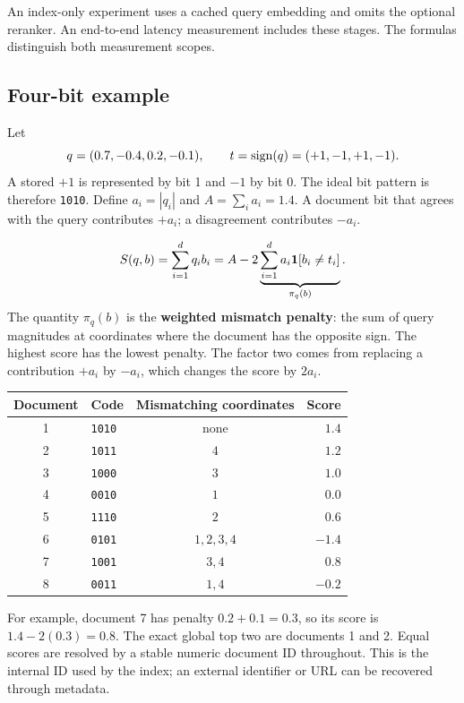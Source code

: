 An index-only experiment uses a cached query embedding and omits the optional
reranker. An end-to-end latency measurement includes these stages. The formulas distinguish
both measurement scopes.

\subsection{Four-bit example}
Let
\[
q=(0.7,-0.4,0.2,-0.1),\qquad t=\operatorname{sign}(q)=(+1,-1,+1,-1).
\]
A stored $+1$ is represented by bit 1 and $-1$ by bit 0. The ideal bit pattern is therefore
\texttt{1010}. Define $a_i=|q_i|$ and $A=\sum_i a_i=1.4$. A document bit that agrees with the
query contributes $+a_i$; a disagreement contributes $-a_i$.

\begin{equation}
S(q,b)=\sum_{i=1}^{d}q_i b_i
       =A-2\underbrace{\sum_{i=1}^{d}a_i\mathbf 1[b_i\ne t_i]}_{\pi_q(b)}.
\label{eq:score}
\end{equation}
The quantity $\pi_q(b)$ is the \textbf{weighted mismatch penalty}: the sum of query
magnitudes at coordinates where the document has the opposite sign. The highest score has the lowest penalty. The factor two comes from replacing a
contribution $+a_i$ by $-a_i$, which changes the score by $2a_i$.

\begin{center}
\begin{tabular}{@{}clcr@{}}\toprule
Document & Code & Mismatching coordinates & Score\\\midrule
1 & \texttt{1010} & none & $1.4$\\
2 & \texttt{1011} & $4$ & $1.2$\\
3 & \texttt{1000} & $3$ & $1.0$\\
4 & \texttt{0010} & $1$ & $0.0$\\
5 & \texttt{1110} & $2$ & $0.6$\\
6 & \texttt{0101} & $1,2,3,4$ & $-1.4$\\
7 & \texttt{1001} & $3,4$ & $0.8$\\
8 & \texttt{0011} & $1,4$ & $-0.2$\\\bottomrule
\end{tabular}
\end{center}
For example, document 7 has penalty $0.2+0.1=0.3$, so its score is $1.4-2(0.3)=0.8$.
The exact global top two are documents 1 and 2. Equal scores are resolved by a stable numeric document ID throughout. This is the internal ID used by the index; an external identifier or URL can be recovered through metadata.

